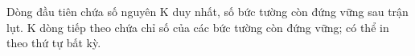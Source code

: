 Dòng đầu tiên chứa số nguyên K duy nhất, số bức tường còn đứng vững sau trận lụt. K dòng tiếp theo chứa chỉ số của các bức tường còn đứng vững; có thể in theo thứ tự bất kỳ.